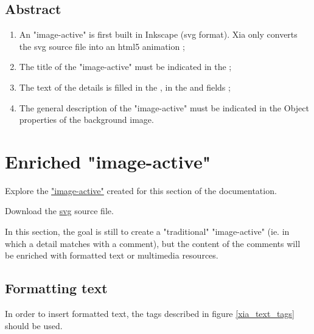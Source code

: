 \subsection{Abstract}

\begin{enumerate}
 \item An "image-active" is first built in Inkscape (svg format). Xia only 
 converts the svg source file into an html5 animation ;
 \item The title of the "image-active" must be indicated in the  ;
 \item The text of the details is filled in the , 
 in the  and  fields ;
 \item The general description of the "image-active" must be indicated in the \chemin
{Object properties} of the background image.
\end{enumerate}

\section{Enriched "image-active"}\label{enriched_IA}

\begin{links}
Explore the \href{http://images-actives.crdp-versailles.fr/beta/demo/tuto/xia2}{"image-active"} created for this section of the documentation.

Download the \href{http://images-actives.crdp-versailles.fr/beta/demo/tuto/xia2/svg/xia2.svg}{svg} source file.
\end{links}

In this section, the goal is still to create a "traditional" "image-active" 
(ie. in which a detail matches with a comment), but the content of the comments 
will be enriched with  formatted text or multimedia resources.


\newpage
\subsection{Formatting text}

In order to insert formatted text, the tags described in figure \ref{xia_text_tags} should be used.

